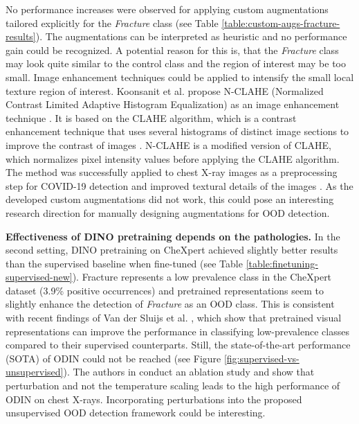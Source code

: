 No performance increases were observed for applying custom augmentations tailored explicitly for the \textit{Fracture} class (see Table \ref{table:custom-augs-fracture-results}).
The augmentations can be interpreted as heuristic and no performance gain could be recognized.
A potential reason for this is, that the \textit{Fracture} class may look quite similar to the control class and the region of interest may be too small. 
Image enhancement techniques could be applied to intensify the small local texture region of interest.
Koonsanit et al. propose N-CLAHE (Normalized Contrast Limited Adaptive Histogram Equalization) as an image enhancement technique \citep{Koonsanit2017}.
It is based on the CLAHE algorithm, which is a contrast enhancement technique that uses several histograms of distinct image sections to improve the contrast of images \citep{Zuiderveld1994}.
N-CLAHE is a modified version of CLAHE, which normalizes pixel intensity values before applying the CLAHE algorithm.
The method was successfully applied to chest X-ray images as a preprocessing step for COVID-19 detection and improved textural details of the images \citep{Horry2020}.
As the developed custom augmentations did not work, this could pose an interesting research direction for manually designing augmentations for OOD detection.
\par
\textbf{Effectiveness of DINO pretraining depends on the pathologies.} 
In the second setting, DINO pretraining on CheXpert achieved slightly better results than the supervised baseline when fine-tuned (see Table \ref{table:finetuning-supervised-new}).
Fracture represents a low prevalence class in the CheXpert dataset (3.9\% positive occurrences) and pretrained representations seem to slightly enhance the detection of \textit{Fracture} as an OOD class.
This is consistent with recent findings of Van der Sluijs et al. \citep{Vandersluijs2023}, which show that pretrained visual representations can improve the performance in classifying low-prevalence classes compared to their supervised counterparts.
Still, the state-of-the-art performance (SOTA) of ODIN could not be reached (see Figure \ref{fig:supervised-vs-unsupervised}).
The authors in \citep{Berger2021} conduct an ablation study and show that perturbation and not the temperature scaling leads to the high performance of ODIN on chest X-rays.
Incorporating perturbations into the proposed unsupervised OOD detection framework could be interesting.
